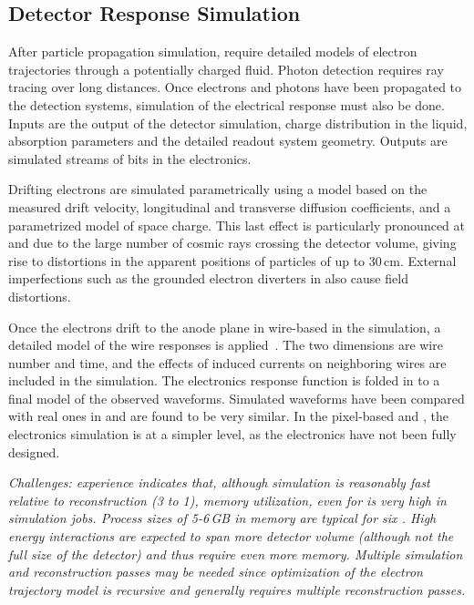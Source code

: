 \documentclass[../main-v1.tex]{subfiles}
\begin{document}
\subsection{Detector Response Simulation}
After particle propagation simulation, 
 require detailed models of electron trajectories through a potentially charged fluid.  Photon detection requires ray tracing over long distances.  Once electrons and photons have been propagated to the detection systems, simulation of the electrical response must also be done. Inputs are the output of the detector simulation, charge distribution in the liquid, absorption parameters and the detailed readout system geometry. Outputs are simulated streams of bits in the electronics. 

  




Drifting electrons are simulated parametrically using a model based on the measured drift velocity, longitudinal and transverse diffusion coefficients, and a parametrized model of space charge.  This last effect is particularly pronounced at  and  due to the large number of cosmic rays crossing the detector volume, giving rise to distortions in the apparent positions of particles of up to 30\,cm.  %
External imperfections such as the grounded electron diverters in  also cause field distortions.

Once the electrons drift to the anode plane in wire-based  in the simulation, a detailed \twod model of the wire responses is applied~\cite{Abi:2020mwi}.  The two dimensions are wire number and time, and the effects of induced currents on neighboring wires are included in the simulation.  The electronics response function is folded in to a final model of the observed waveforms.  Simulated waveforms have been compared with real ones  in  and are found to be very similar.
In the pixel-based  and , the electronics simulation is at a simpler level, as the electronics have not been fully designed.

{\it Challenges:  
 experience indicates that, although simulation is reasonably fast relative to reconstruction (3 to 1), memory utilization, even for  %
is very high in simulation jobs.  Process sizes of 5-6\,GB in memory are typical for six .  High energy  interactions are expected to span more detector volume (although not the full size of the detector) and thus require even more memory. Multiple %
simulation and reconstruction passes may be needed since optimization of the electron trajectory model is recursive and generally requires multiple reconstruction passes. }
\end{document}
